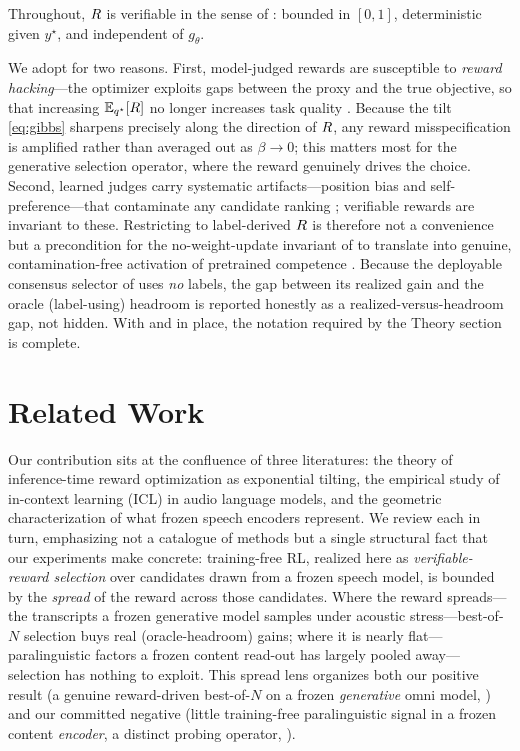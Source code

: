 \begin{assumption}[Verifiability]
\label{ass:verifiable}
Throughout, $R$ is verifiable in the sense of : bounded in $[0,1]$, deterministic given $y^\star$, and independent of $g_\theta$.
\end{assumption}

We adopt  for two reasons. First, model-judged rewards are susceptible to \emph{reward hacking}---the optimizer exploits gaps between the proxy and the true objective, so that increasing $\mathbb{E}_{q^{\star}}[R]$ no longer increases task quality \citep{skalse2022rewardhacking,gao2023overopt}. Because the tilt \eqref{eq:gibbs} sharpens precisely along the direction of $R$, any reward misspecification is amplified rather than averaged out as $\beta\to 0$; this matters most for the generative selection operator, where the reward genuinely drives the choice. Second, learned judges carry systematic artifacts---position bias and self-preference---that contaminate any candidate ranking \citep{positionbias2024,selfpreference2024}; verifiable rewards are invariant to these. Restricting to label-derived $R$ is therefore not a convenience but a precondition for the no-weight-update invariant of  to translate into genuine, contamination-free activation of pretrained competence \citep{tulu3}. Because the deployable consensus selector of  uses \emph{no} labels, the gap between its realized gain and the oracle (label-using) headroom is reported honestly as a realized-versus-headroom gap, not hidden. With  and  in place, the notation required by the Theory section is complete.

\section{Related Work}
\label{sec:related}

Our contribution sits at the confluence of three literatures: the theory of inference-time reward optimization as exponential tilting, the empirical study of in-context learning (ICL) in audio language models, and the geometric characterization of what frozen speech encoders represent. We review each in turn, emphasizing not a catalogue of methods but a single structural fact that our experiments make concrete: training-free RL, realized here as \emph{verifiable-reward selection} over candidates drawn from a frozen speech model, is bounded by the \emph{spread} of the reward across those candidates. Where the reward spreads---the transcripts a frozen generative model samples under acoustic stress---best-of-$N$ selection buys real (oracle-headroom) gains; where it is nearly flat---paralinguistic factors a frozen content read-out has largely pooled away---selection has nothing to exploit. This spread lens organizes both our positive result (a genuine reward-driven best-of-$N$ on a frozen \emph{generative} omni model, ) and our committed negative (little training-free paralinguistic signal in a frozen content \emph{encoder}, a distinct probing operator, ).


